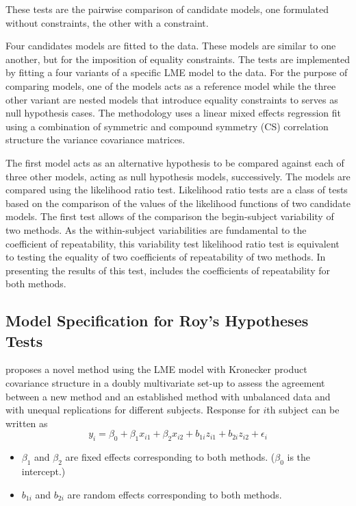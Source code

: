 \documentclass[12pt, a4paper]{report}
\theoremstyle{plain}
\theoremstyle{definition}
\theoremstyle{remark}
\begin{document}
	
	These tests are the pairwise comparison of candidate models, one formulated without constraints, the other with a constraint.
	
	
	Four candidates models are fitted to the data. These models are similar to one another, but for the imposition of equality constraints. The tests are implemented by fitting a four variants of a specific LME model to the data. For the purpose of comparing models, one of the models acts as a reference model while the three other variant are nested models that introduce equality constraints to serves as null hypothesis cases. The methodology uses a linear mixed effects regression fit using a combination of symmetric and 
	compound symmetry (CS) correlation structure the variance covariance matrices.
	
	
	
	
	The first model acts as an alternative hypothesis to be compared against each of three other models, acting as null hypothesis models, successively. The models are compared using the likelihood ratio test. Likelihood ratio tests are a class of tests based on the comparison of the values of the likelihood functions of two candidate models. 
	The first test allows of the comparison the begin-subject variability of two methods. As the within-subject variabilities are fundamental to the coefficient of repeatability, this variability test likelihood ratio test is equivalent to testing the equality of two coefficients of repeatability of two methods. In presenting the results of this test, \citet{ARoy2009} includes the coefficients of repeatability for both methods.
	
	\subsection{Model Specification for Roy's Hypotheses Tests}
	
	\citet{ARoy2009} proposes a novel method using the LME model with Kronecker product covariance structure in a doubly multivariate set-up to assess the agreement between a new method and an established method with unbalanced data and with unequal replications for different subjects.
	Response for $i$th subject can be written as
	\[ y_i = \beta_0 + \beta_1x_{i1} + \beta_2x_{i2} + b_{1i}z_{i1}  + b_{2i}z_{i2} + \epsilon_i \]
	\begin{itemize}
		\item $\beta_1$ and $\beta_2$ are fixed effects corresponding to both methods. ($\beta_0$ is the intercept.)
		\item $b_{1i}$ and $b_{2i}$ are random effects corresponding to both methods.
	\end{itemize}
	
\end{document}
